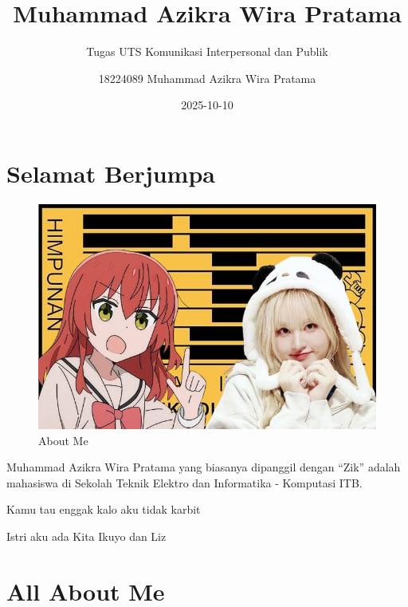 \documentclass[
  letterpaper,
  DIV=11,
  numbers=noendperiod]{scrreprt}
\title{Muhammad Azikra Wira Pratama}
\subtitle{Tugas UTS Komunikasi Interpersonal dan Publik}
\author{18224089 Muhammad Azikra Wira Pratama}
\date{2025-10-10}
\renewcommand*\contentsname{Table of contents}
\newcommand\contentsname{Table of contents}
\begin{document}
\maketitle

\renewcommand*\contentsname{Table of contents}
{
\hypersetup{linkcolor=}
\setcounter{tocdepth}{2}
\tableofcontents
}


\chapter*{Selamat Berjumpa}\label{selamat-berjumpa}


\begin{figure}[H]

{\centering \includegraphics[width=9.5\linewidth,height=\textheight,keepaspectratio]{images/CoverIstri.jpg}

}

\caption{About Me}

\end{figure}%

Muhammad Azikra Wira Pratama yang biasanya dipanggil dengan ``Zik''
adalah mahasiswa di Sekolah Teknik Elektro dan Informatika - Komputasi
ITB.

Kamu tau enggak kalo aku tidak karbit

Istri aku ada Kita Ikuyo dan Liz


\chapter{All About Me}\label{all-about-me}
\end{document}
